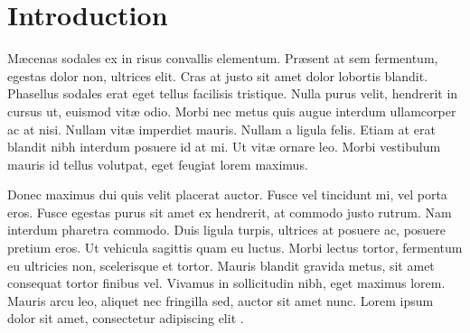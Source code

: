 
\RequirePackage{iftex}
\ifLuaTeX

\else
{}
{}
\fi




\section{Introduction} %

M\ae{}cenas sodales ex in risus convallis elementum. Pr\ae{}sent at sem fermentum, egestas dolor non, ultrices elit. Cras at justo sit amet dolor lobortis blandit. Phasellus sodales erat eget tellus facilisis tristique. Nulla purus velit, hendrerit in cursus ut, euismod vit\ae{} odio. Morbi nec metus quis augue interdum ullamcorper ac at nisi. Nullam vit\ae{} imperdiet mauris. Nullam a ligula felis. Etiam at erat blandit nibh interdum posuere id at mi. Ut vit\ae{} ornare leo. Morbi vestibulum mauris id tellus volutpat, eget feugiat lorem maximus.

Donec maximus dui quis velit placerat auctor. Fusce vel tincidunt mi, vel porta eros. Fusce egestas purus sit amet ex hendrerit, at commodo justo rutrum. Nam interdum pharetra commodo. Duis ligula turpis, ultrices at posuere ac, posuere pretium eros. Ut vehicula sagittis quam eu luctus. Morbi lectus tortor, fermentum eu ultricies non, scelerisque et tortor. Mauris blandit gravida metus, sit amet consequat tortor finibus vel. Vivamus in sollicitudin nibh, eget maximus lorem. Mauris arcu leo, aliquet nec fringilla sed, auctor sit amet nunc. Lorem ipsum dolor sit amet, consectetur adipiscing elit \cite{long}.

